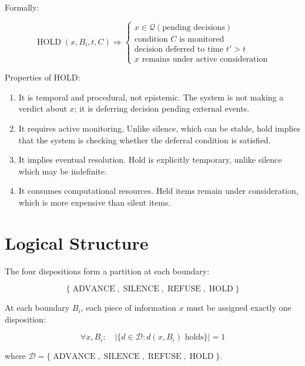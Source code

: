 \documentclass[12pt]{article}
\begin{document}
Formally:

\begin{equation}
\operatorname{HOLD}(x, B_i, t, C) \Rightarrow \begin{cases}
x \in \mathcal{Q}(\text{pending decisions})\\
\text{condition } C \text{ is monitored}\\
\text{decision deferred to time } t' > t\\
x \text{ remains under active consideration}
\end{cases}
\end{equation}

Properties of HOLD:
\begin{enumerate}
\item It is temporal and procedural, not epistemic. The system is not making a verdict about $x$; it is deferring decision pending external events.
\item It requires active monitoring. Unlike silence, which can be stable, hold implies that the system is checking whether the deferral condition is satisfied.
\item It implies eventual resolution. Hold is explicitly temporary, unlike silence which may be indefinite.
\item It consumes computational resources. Held items remain under consideration, which is more expensive than silent items.
\end{enumerate}

\section{Logical Structure}

The four dispositions form a partition at each boundary:

\begin{equation}
\{\operatorname{ADVANCE}, \operatorname{SILENCE}, \operatorname{REFUSE}, \operatorname{HOLD}\}
\end{equation}

At each boundary $B_i$, each piece of information $x$ must be assigned exactly one disposition:

\begin{equation}
\forall x, B_i: \quad \left|\{d \in \mathcal{D} : d(x, B_i) \text{ holds}\}\right| = 1
\end{equation}

where $\mathcal{D} = \{\operatorname{ADVANCE}, \operatorname{SILENCE}, \operatorname{REFUSE}, \operatorname{HOLD}\}$.
\end{document}
